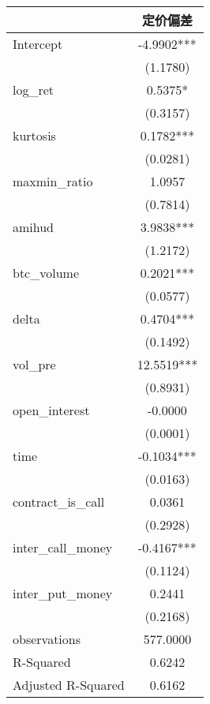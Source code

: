 \begin{tabular}{lc}
\hline
                   &    定价偏差     \\
\midrule
\midrule
Intercept          & -4.9902***  \\
                   & (1.1780)    \\
log\_ret           & 0.5375*     \\
                   & (0.3157)    \\
kurtosis           & 0.1782***   \\
                   & (0.0281)    \\
maxmin\_ratio      & 1.0957      \\
                   & (0.7814)    \\
amihud             & 3.9838***   \\
                   & (1.2172)    \\
btc\_volume        & 0.2021***   \\
                   & (0.0577)    \\
delta              & 0.4704***   \\
                   & (0.1492)    \\
vol\_pre           & 12.5519***  \\
                   & (0.8931)    \\
open\_interest     & -0.0000     \\
                   & (0.0001)    \\
time               & -0.1034***  \\
                   & (0.0163)    \\
contract\_is\_call & 0.0361      \\
                   & (0.2928)    \\
inter\_call\_money & -0.4167***  \\
                   & (0.1124)    \\
inter\_put\_money  & 0.2441      \\
                   & (0.2168)    \\
observations       & 577.0000    \\
R-Squared          & 0.6242      \\
Adjusted R-Squared & 0.6162      \\
\hline
\end{tabular}